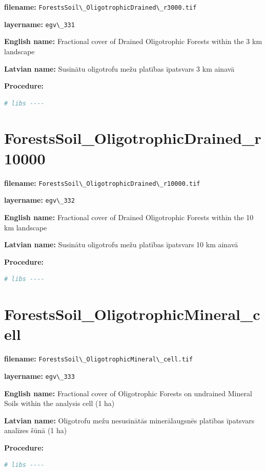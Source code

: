 \documentclass[
]{book}
\newcommand{\passthrough}[1]{#1}
\begin{document}
\textbf{filename:} \passthrough{\lstinline!ForestsSoil\_OligotrophicDrained\_r3000.tif!}

\textbf{layername:} \passthrough{\lstinline!egv\_331!}

\textbf{English name:} Fractional cover of Drained Oligotrophic Forests within the 3 km landscape

\textbf{Latvian name:} Susinātu oligotrofu mežu platības īpatsvars 3 km ainavā

\textbf{Procedure:}

\begin{lstlisting}[language=R]
# libs ----
\end{lstlisting}

\section{ForestsSoil\_OligotrophicDrained\_r10000}\label{ch06.332}

\textbf{filename:} \passthrough{\lstinline!ForestsSoil\_OligotrophicDrained\_r10000.tif!}

\textbf{layername:} \passthrough{\lstinline!egv\_332!}

\textbf{English name:} Fractional cover of Drained Oligotrophic Forests within the 10 km landscape

\textbf{Latvian name:} Susinātu oligotrofu mežu platības īpatsvars 10 km ainavā

\textbf{Procedure:}

\begin{lstlisting}[language=R]
# libs ----
\end{lstlisting}

\section{ForestsSoil\_OligotrophicMineral\_cell}\label{ch06.333}

\textbf{filename:} \passthrough{\lstinline!ForestsSoil\_OligotrophicMineral\_cell.tif!}

\textbf{layername:} \passthrough{\lstinline!egv\_333!}

\textbf{English name:} Fractional cover of Oligotrophic Forests on undrained Mineral Soils within the analysis cell (1 ha)

\textbf{Latvian name:} Oligotrofu mežu nesusinātās minerālaugsnēs platības īpatsvars analīzes šūnā (1 ha)

\textbf{Procedure:}

\begin{lstlisting}[language=R]
# libs ----
\end{lstlisting}
\end{document}
